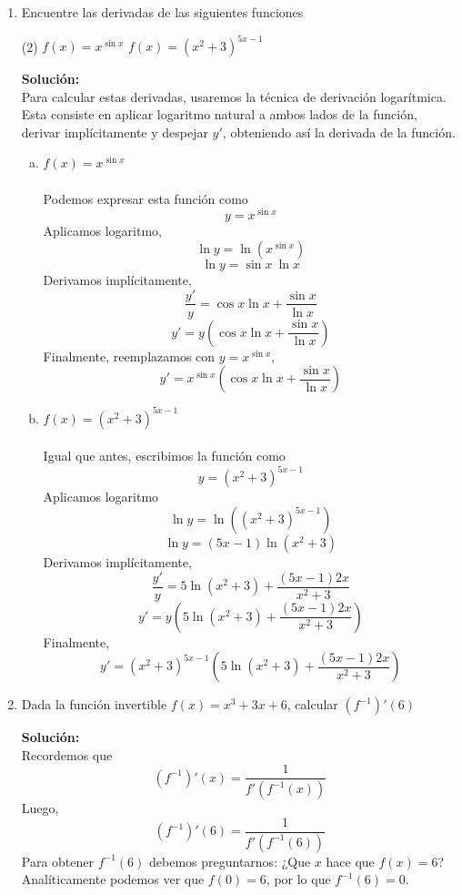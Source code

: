 \documentclass[12pt]{article}
\newenvironment{solucion}
{\begin{mdframed}[backgroundcolor=black!10]
		{\bf Solución:}\\
	}
	{
	\end{mdframed}
}
\newenvironment{preguntas}
{\begin{enumerate}\itemsep12pt
	}
	{
	\end{enumerate}
}
\begin{document}
\begin{preguntas}
\begin{solucion}
Entonces, tomamos
$$xy' + 2yy' = 2x-y$$
Y derivamos implícitamente,
$$y' + xy'' + 2y'^2+2yy'' = 2 - y'$$
Luego, despejamos $y''$,
$$xy''+2yy'' = 2 - y' - y' - 2y'^2$$
$$y''(x+2y) = 2 - 2y' - 2y'^2$$
$$y'' = \dfrac{2 - 2y' - 2y'^2}{x+2y}$$
Ahora, notemos que
$$y'(1,1) = \dfrac{2-1}{1+2} = \dfrac{1}{3}$$
Luego,
$$y''(1,1) = \dfrac{2-2\dfrac{1}{3} - 2\left(\dfrac{1}{3}\right)^2}{1+2} 
= \dfrac{2-\dfrac{2}{3}-\dfrac{2}{9}}{3}
= \dfrac{2-\dfrac{2}{3}-\dfrac{2}{9}}{3}
= \dfrac{10}{27}
$$
\end{solucion}
\item Encuentre las derivadas de las siguientes funciones
\begin{tasks}(2)
\task $f(x) = x^{\sin x}$
\task $f(x) = (x^2+3)^{5x-1}$
\end{tasks}
\begin{solucion}
Para calcular estas derivadas, usaremos la técnica de derivación logarítmica. Esta consiste en aplicar logaritmo natural a ambos lados de la función, derivar implícitamente y despejar $y'$, obteniendo así la derivada de la función.
\begin{enumerate}[a)]
\item $f(x) = x^{\sin x}$\\
\\
Podemos expresar esta función como
$$y = x^{\sin x}$$
Aplicamos logaritmo,
$$\ln y = \ln(x^{\sin x})$$
$$\ln y = \sin x\ \ln x$$
Derivamos implícitamente,
$$\dfrac{y'}{y} = \cos x \ln x + \dfrac{\sin x}{\ln x}$$
$$y' = y(\cos x \ln x + \dfrac{\sin x}{\ln x})$$
Finalmente, reemplazamos con $y = x^{\sin x}$,
$$y' = x^{\sin x}(\cos x \ln x + \dfrac{\sin x}{\ln x})$$
\item $f(x) = (x^2+3)^{5x-1}$\\
\\
Igual que antes, escribimos la función como
$$y = (x^2+3)^{5x-1}$$
Aplicamos logaritmo
$$\ln y = \ln((x^2+3)^{5x-1})$$
$$\ln y = (5x-1)\ln(x^2+3)$$
Derivamos implícitamente,
$$\dfrac{y'}{y} = 5\ln(x^2+3) + \dfrac{(5x-1)2x}{x^2+3}$$
$$y' = y(5\ln(x^2+3) + \dfrac{(5x-1)2x}{x^2+3})$$
Finalmente,
$$y' = (x^2+3)^{5x-1}(5\ln(x^2+3) + \dfrac{(5x-1)2x}{x^2+3})$$
\end{enumerate}
\end{solucion}
\item Dada la función invertible $f(x) = x^3 + 3x + 6$, calcular $(f^{-1})'(6)$
\begin{solucion}
Recordemos que 
$$(f^{-1})'(x) = \dfrac{1}{f'(f^{-1}(x))}$$
Luego,
$$(f^{-1})'(6) = \dfrac{1}{f'(f^{-1}(6))}$$
Para obtener $f^{-1}(6)$ debemos preguntarnos: ¿Que $x$ hace que $f(x) = 6$? Analíticamente podemos ver que $f(0) = 6$, por lo que $f^{-1}(6) = 0$.\\


\end{solucion}
\end{preguntas}
\end{document}
